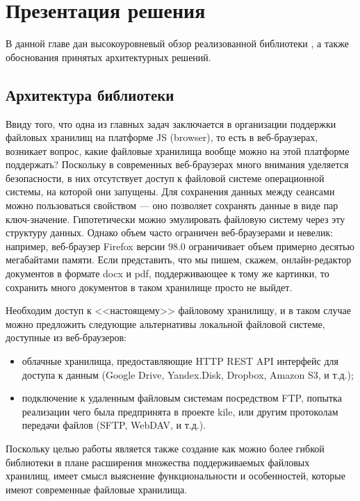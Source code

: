 \section{Презентация решения}

В данной главе дан высокоуровневый обзор реализованной библиотеки \cite{gh-multifs}, а также обоснования принятых архитектурных решений.

\subsection{Архитектура библиотеки}
  Ввиду того, что одна из главных задач заключается в организации поддержки файловых хранилищ на платформе JS (browser), то есть в веб-браузерах, возникает вопрос, какие файловые хранилища вообще можно на этой платформе поддержать? Поскольку в современных веб-браузерах много внимания уделяется безопасности, в них отсутствует доступ к файловой системе операционной системы, на которой они запущены. Для сохранения данных между сеансами можно пользоваться свойством \cite{dev-mozilla-localstorage} --- оно позволяет сохранять данные в виде пар ключ-значение. Гипотетически можно эмулировать файловую систему через эту структуру данных. Однако объем  часто ограничен веб-браузерами и невелик: например, веб-браузер Firefox версии 98.0 ограничивает объем  примерно десятью мегабайтами памяти. Если представить, что мы пишем, скажем, онлайн-редактор документов в формате docx и pdf, поддерживающее к тому же картинки, то сохранить много документов в таком хранилище просто не выйдет.

  Необходим доступ к <<настоящему>> файловому хранилищу, и в таком случае можно предложить следующие альтернативы локальной файловой системе, доступные из веб-браузеров:
  \begin{itemize}
    \item облачные хранилища, предоставляющие HTTP REST\cite{rest} API интерфейс для доступа к данным (Google Drive, Yandex.Disk, Dropbox, Amazon S3, и т.д.);
    \item подключение к удаленным файловым системам посредством FTP\cite{ftp}, попытка реализации чего была предпринята в проекте kile\cite{gh-kile}, или другим протоколам передачи файлов (SFTP, WebDAV, и т.д.).
  \end{itemize}

  Поскольку целью работы является также создание как можно более гибкой библиотеки в плане расширения множества поддерживаемых файловых хранилищ, имеет смысл выяснение функциональности и особенностей, которые имеют современные файловые хранилища.

